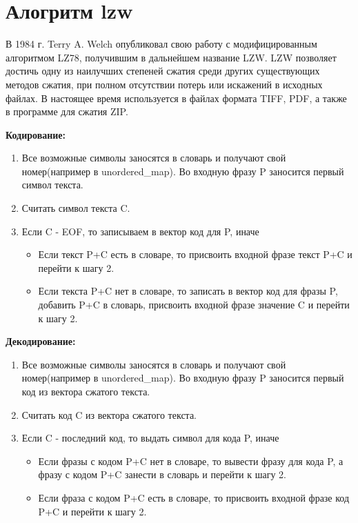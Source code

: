 \section{Алогритм lzw}
В 1984 г. Terry A. Welch опубликовал свою работу с модифицированным алгоритмом LZ78, получившим в дальнейшем название LZW. LZW позволяет достичь одну из наилучших степеней сжатия среди других существующих методов сжатия, при полном отсутствии потерь или искажений в исходных файлах. В настоящее время используется в файлах формата TIFF, PDF, а также в программе для сжатия ZIP.

\textbf{Кодирование:}
\begin{enumerate}
\item Все возможные символы заносятся в словарь и получают свой номер(например в unordered\_map). Во входную фразу P заносится первый символ текста.
\item Считать символ текста C.
\item Если C - EOF, то записываем в вектор код для P, иначе
\begin{itemize}
\item Если текст P+C есть в словаре, то присвоить входной фразе текст P+C и перейти к шагу 2.
\item Если текста P+C нет в словаре, то записать в вектор код для фразы P, добавить P+C в словарь, присвоить входной фразе значение C и перейти к шагу 2.
\end{itemize}
\end{enumerate}

\textbf{Декодирование:}
\begin{enumerate}
\item Все возможные символы заносятся в словарь и получают свой номер(например в unordered\_map). Во входную фразу P заносится первый код из вектора сжатого текста.
\item Считать код C из вектора сжатого текста.
\item Если C - последний код, то выдать символ для кода P, иначе
\begin{itemize}
\item Если фразы с кодом P+C нет в словаре, то вывести фразу для кода P, а фразу с кодом P+C занести в словарь и перейти к шагу 2.
\item Если фраза с кодом P+C есть в словаре, то присвоить входной фразе код P+C и перейти к шагу 2.
\end{itemize}
\end{enumerate}
	
\pagebreak

